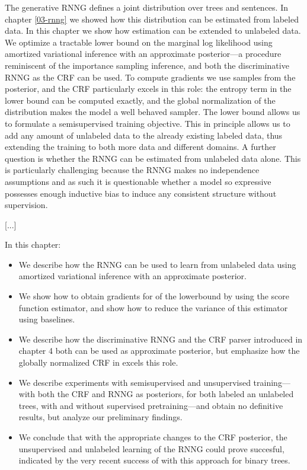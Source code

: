 The generative RNNG defines a joint distribution over trees and sentences. In chapter \ref{03-rnng} we showed how this distribution can be estimated from labeled data. In this chapter we show how estimation can be extended to unlabeled data. We optimize a tractable lower bound on the marginal log likelihood using amortized variational inference with an approximate posterior---a procedure reminiscent of the importance sampling inference, and both the discriminative RNNG as the CRF can be used. To compute gradients we use samples from the posterior, and the CRF particularly excels in this role: the entropy term in the lower bound can be computed exactly, and the global normalization of the distribution makes the model a well behaved sampler. The lower bound allows us to formulate a semisupervised training objective. This in principle allows us to add any amount of unlabeled data to the already existing labeled data, thus extending the training to both more data and different domains. A further question is whether the RNNG can be estimated from unlabeled data alone. This is particularly challenging because the RNNG makes no independence assumptions and as such it is questionable whether a model so expressive possesses enough inductive bias to induce any consistent structure without supervision.

[...]

In this chapter:
\begin{itemize}
  \item We describe how the RNNG can be used to learn from unlabeled data using amortized variational inference with an approximate posterior.
  \item We show how to obtain gradients for of the lowerbound by using the score function estimator, and show how to reduce the variance of this estimator using baselines.
  \item We describe how the discriminative RNNG and the CRF parser introduced in chapter 4 both can be used as approximate posterior, but emphasize how the globally normalized CRF in excels this role.
  \item We describe experiments with semisupervised and unsupervised training---with both the CRF and RNNG as posteriors, for both labeled an unlabeled trees, with and without supervised pretraining---and obtain no definitive results, but analyze our preliminary findings.
  \item We conclude that with the appropriate changes to the CRF posterior, the unsupervised and unlabeled learning of the RNNG could prove succesful, indicated by the very recent success of \citet{kim2019unsupervised} with this approach for binary trees.
\end{itemize}

